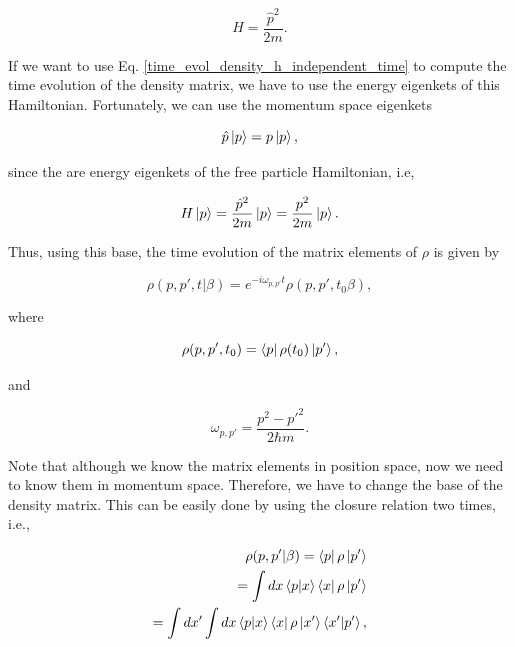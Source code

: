\documentclass{article}
\begin{document}
\begin{equation*}
    H = \frac{\hat{p}^{2}}{2m}.
\end{equation*}

If we want to use Eq. \ref{time_evol_density_h_independent_time} to compute the time evolution of the density matrix, we have to use the energy eigenkets of this Hamiltonian. Fortunately, we can use the momentum space eigenkets

\begin{equation}
    \hat{p}\ket{p} = p \ket{p},
\end{equation}

since the are energy eigenkets of the free particle Hamiltonian, i.e,

\begin{equation}
   H \ket{p} = \frac{\hat{p}^{2}}{2m} \ket{p} = \frac{p^{2}}{2m} \ket{p}.
\end{equation}

Thus, using this base, the time evolution of the matrix elements of $\rho$ is given by

\begin{equation}\label{time_evo_energy_eigenkets}
    \rho(p,p',t|\beta) = e^{-i\omega_{p,p'}t} \rho(p,p',t_{0}\beta),
\end{equation}

where

\begin{equation}
    \rho(p,p',t_{0}) = \bra{p} \rho(t_{0}) \ket{p'},
\end{equation}

and

\begin{equation}
    \omega_{p,p'} = \frac{p^{2}-p'^{2}}{2\hbar m}.
\end{equation}

Note that although we know the matrix elements in position space, now we need to know them in momentum space. Therefore, we have to change the base of the density matrix. This can be easily done by using the closure relation two times, i.e.,

\begin{equation}
    \begin{split}
        \rho(p,p'|\beta) = \bra{p} \rho \ket{p'} \\ = \int dx \braket{p|x} \bra{x} \rho \ket{p'} \\ =\int dx' \int dx \braket{p|x} \bra{x} \rho \ket{x'} \braket{x'|p'},
    \end{split}
\end{equation}
\end{document}
